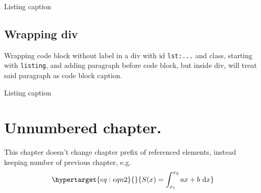 \begin{codelisting}

\caption{Listing caption}

\hypertarget{lst:tableCaption}{%
\label{lst:tableCaption}}%
\begin{Shaded}
\begin{Highlighting}[]
 \NormalTok{ ()}
\OtherTok{=}  
\end{Highlighting}
\end{Shaded}

\end{codelisting}

\hypertarget{sec:wrapping-div}{%
\subsection{Wrapping div}\label{sec:wrapping-div}}

Wrapping code block without label in a div with id \texttt{lst:...} and class,
starting with \texttt{listing}, and adding paragraph before code block, but
inside div, will treat said paragraph as code block caption.

\begin{codelisting}

\caption{Listing caption}

\hypertarget{lst:wrappingDiv}{%
\label{lst:wrappingDiv}}%
\begin{Shaded}
\begin{Highlighting}[]
 \NormalTok{ ()}
\OtherTok{=}  
\end{Highlighting}
\end{Shaded}

\end{codelisting}

\hypertarget{sec:unnumbered-chapter.}{%
\section*{Unnumbered chapter.}\label{sec:unnumbered-chapter.}}

This chapter doesn't change chapter prefix of referenced elements, instead
keeping number of previous chapter, e.g.
\begin{equation}\protect\hypertarget{eq:eqn2}{}{ S(x) = \int_{x_1}^{x_2} a x+b \  \mathrm{d}x }\label{eq:eqn2}\end{equation}

